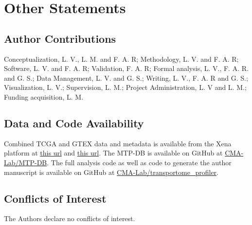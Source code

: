 \section{Other Statements}

\subsection{Author Contributions}
Conceptualization, L. V., L. M. and F. A. R;
Methodology, L. V. and F. A. R;
Software, L. V. and F. A. R;
Validation, F. A. R;
Formal analysis, L. V., F. A. R. and G. S.;
Data Management, L. V. and G. S.;
Writing, L. V., F. A. R and G. S.;
Visualization, L. V.;
Supervision, L. M.;
Project Administration, L. V and L. M.;
Funding acquisition, L. M.


\subsection{Data and Code Availability}
Combined TCGA and GTEX data and metadata is available from the Xena platform at
\href{https://toil-xena-hub.s3.us-east-1.amazonaws.com/download/TcgaTargetGtex_gene_expected_count.gz }{this url} and \href{https://toil-xena-hub.s3.us-east-1.amazonaws.com/download/TcgaTargetGTEX_phenotype.txt.gz}{this url}.
The MTP-DB is available on GitHub at \href{https://github.com/CMA-Lab/MTP-DB}{CMA-Lab/MTP-DB}.
The full analysis code as well as  code to generate the author
manuscript is available on GitHub at \href{https://github.com/CMA-Lab/transportome_profiler}{CMA-Lab/transportome\_profiler}.

\subsection{Conflicts of Interest}
The Authors declare no conflicts of interest.
